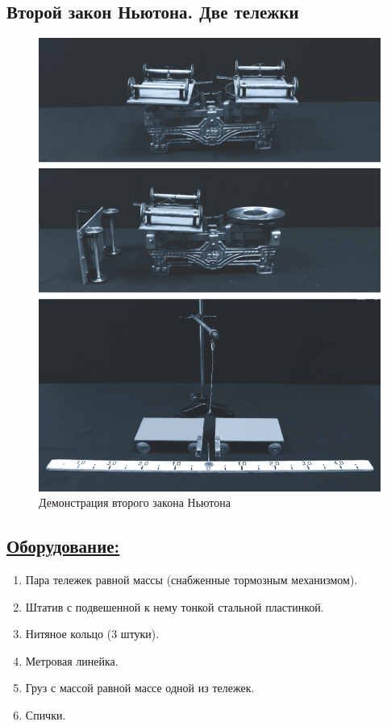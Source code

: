 \documentclass[14pt,a4paper,oneside]{extarticle}	%
\begin{document}

\newpage
\begin{center}
	\subsection*{Второй закон Ньютона. Две тележки}
\end{center}

\begin{figure}[H]
	\centering 		
	\includegraphics[width=0.6\linewidth]{newton-1.png}
	\caption{Демонстрация второго закона Ньютона}
	\label{newton-1}
\end{figure}

\subsection*{\underline{Оборудование:}}

\begin{enumerate}
	\item Пара тележек равной массы (снабженные тормозным механизмом).
	\item Штатив с подвешенной к нему тонкой стальной пластинкой.
	\item Нитяное кольцо (3 штуки).
	\item Метровая линейка.
	\item Груз с массой равной массе одной из тележек.
	\item Спички.
\end{enumerate}
\end{document}
